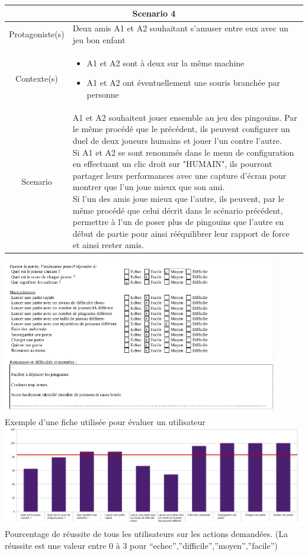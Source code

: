 \documentclass{report}
\begin{document}
\begin{tabular}{|c|l|}
\hline
 \multicolumn{2}{|c|}{Scenario 4}\\
 \hline
 Protagoniste(s) & Deux amis A1 et A2 souhaitant s'amuser entre eux avec un jeu bon enfant \\
 \hline
 Contexte(s) & \parbox{13cm} {\begin{itemize}
 	\item A1 et A2 sont à deux sur la même machine
 	\item A1 et A2 ont éventuellement une souris branchée par personne
\end{itemize} }\\
 \hline
 Scenario & \parbox{13cm}{  A1 et A2 souhaitent jouer ensemble au jeu des pingouins. Par le même procédé que le précédent, ils peuvent configurer un duel de deux joueurs humains et jouer l'un contre l'autre. \\
 Si A1 et A2 se sont renommés dans le menu de configuration en effectuant un clic droit sur "HUMAIN", ils pourront partager leurs performances avec une capture d'écran pour montrer que l'un joue mieux que son ami. \\
 Si l'un des amis joue mieux que l'autre, ils peuvent, par le même procédé que celui décrit dans le scénario précédent, permettre à l'un de poser plus de pingouins que l'autre en début de partie pour ainsi rééquilibrer leur rapport de force et ainsi rester amis.} \\
 \hline
\end{tabular}

\newpage
\begin{center}
  \includegraphics[width=12cm]{image/QuestionnaireIHMBas}
  \\
  Exemple d'une fiche utilisée pour évaluer un utilisateur
  \\
  \vspace{1cm}
  \includegraphics[width=15cm]{image/graphIHM.png}
  \\
  Pourcentage de réussite de tous les utilisateurs sur les actions demandées. (La réussite est une valeur entre 0 à 3 pour ``echec'',''difficile'',''moyen'',''facile'')
\end{center}
\end{document}
